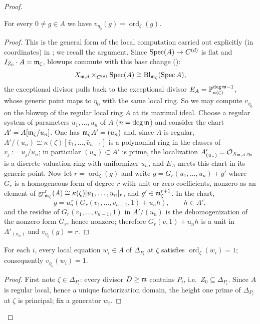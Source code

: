 \begin{proof}
    \begin{claim}\label{claim:exceptional_valuation_is_order}
        For every $0 \neq g \in A$ we have $v_{\eta_0}(g) = \operatorname{ord}_\zeta(g)$.
    \end{claim}
    \begin{proof}
        This is the general form of the local computation carried out explicitly (in coordinates) in
        ; we recall the argument.
        Since $\operatorname{Spec}(A) \to C^{(d)}$ is flat and $I_{Z_0} \cdot A = \mathfrak{m}_\zeta$, blowups commute with
        this base change ():
        \[ X_{\mathfrak{m}, d} \times_{C^{(d)}} \operatorname{Spec}(A) \cong \operatorname{Bl}_{\mathfrak{m}_\zeta}(\operatorname{Spec} A), \]
        the exceptional divisor pulls back to the exceptional divisor
        $E_A = \mathbb{P}^{\deg\mathfrak{m} - 1}_{\kappa(\zeta)}$, whose generic point maps to $\eta_0$ with
        the same local ring. So we may compute $v_{\eta_0}$ on the blowup of the regular local ring $A$
        at its maximal ideal. Choose a regular system of parameters $u_1, \dots, u_n$ of $A$
        ($n = \deg \mathfrak{m}$) and consider the chart $A' = A[\mathfrak{m}_\zeta / u_n]$. One has
        $\mathfrak{m}_\zeta A' = (u_n)$ and, since $A$ is regular,
        $A' / (u_n) \cong \kappa(\zeta)[\bar{v}_1, \dots, \bar{v}_{n-1}]$ is a polynomial ring in the
        classes of $v_j := u_j / u_n$; in particular $(u_n) \subset A'$ is prime, the localization
        $A'_{(u_n)} = \mathcal{O}_{X_{\mathfrak{m},d}, \eta_0}$ is a discrete valuation ring with uniformizer $u_n$,
        and $E_A$ meets this chart in its generic point.
        Now let $r = \operatorname{ord}_\zeta(g)$ and write $g = G_r(u_1, \dots, u_n) + g'$ where $G_r$
        is a homogeneous form of degree $r$ with unit or zero coefficients, nonzero as an element of
        $\operatorname{gr}^r_{\mathfrak{m}_\zeta}(A) \cong \kappa(\zeta)[\bar{u}_1, \dots, \bar{u}_n]_r$, and
        $g' \in \mathfrak{m}_\zeta^{r+1}$. In the chart,
        \[ g = u_n^{\,r}\left( G_r(v_1, \dots, v_{n-1}, 1) + u_n h \right), \qquad h \in A', \]
        and the residue of $G_r(v_1, \dots, v_{n-1}, 1)$ in $A'/(u_n)$ is the dehomogenization of the
        nonzero form $G_r$, hence nonzero; therefore $G_r(v, 1) + u_n h$ is a unit in $A'_{(u_n)}$ and
        $v_{\eta_0}(g) = r$.
    \end{proof}

    \begin{claim}\label{claim:boundary_divisors_have_multiplicity_one}
        For each $i$, every local equation $w_i \in A$ of $\Delta_{P_i}$ at $\zeta$ satisfies
        $\operatorname{ord}_\zeta(w_i) = 1$; consequently $v_{\eta_0}(w_i) = 1$.
    \end{claim}
    \begin{proof}
        First note $\zeta \in \Delta_{P_i}$: every divisor $D \geq \mathfrak{m}$ contains $P_i$, i.e.\
        $Z_0 \subseteq \Delta_{P_i}$. Since $A$ is regular local, hence a unique factorization domain,
        the height one prime of $\Delta_{P_i}$ at $\zeta$ is principal; fix a generator $w_i$.


\end{proof}
\end{proof}
